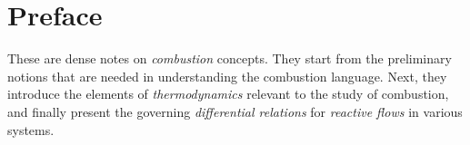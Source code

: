 \documentclass[10pt,twocolumn]{article}
\begin{document}



\vspace{10mm}

\setlength{\parindent}{0cm}

\fontsize{14}{10}\selectfont {Kamila Zdybał}

\vspace{2mm}

\fontsize{8}{10}

\fontsize{8}{10}


\section*{Preface}

These are dense notes on \textit{combustion} concepts. They start from the preliminary notions that are needed in understanding the combustion language. Next, they introduce the elements of \textit{thermodynamics} relevant to the study of combustion, and finally present the governing \textit{differential relations} for \textit{reactive flows} in various systems.
\end{document}
